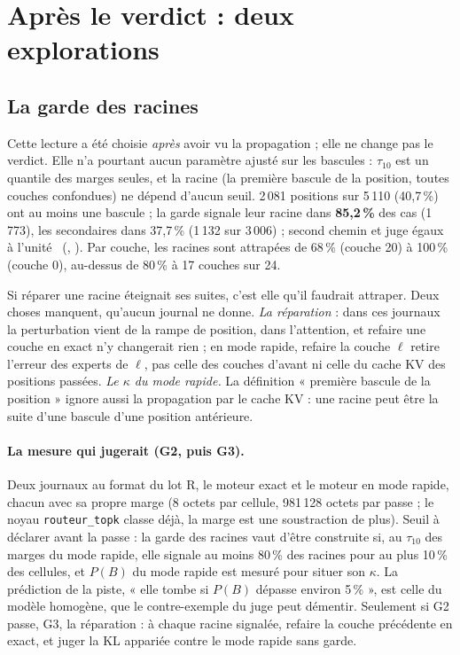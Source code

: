 \section{Après le verdict : deux explorations}\label{t3tro:sec:explorations}

\subsection{La garde des racines}\label{t3tro:sec:racines}

Cette lecture a été choisie \emph{après} avoir vu la propagation ; elle ne change pas le verdict. Elle n'a pourtant aucun paramètre ajusté sur les bascules : $\tau_{10}$ est un quantile des marges seules, et la racine (la première bascule de la position, toutes couches confondues) ne dépend d'aucun seuil. 2\,081 positions sur 5\,110 (40,7\,\%) ont au moins une bascule ; la garde signale leur racine dans \textbf{85,2\,\%} des cas (1\,773), les secondaires dans 37,7\,\% (1\,132 sur 3\,006) ; second chemin et juge égaux à l'unité \mes~(, ). Par couche, les racines sont attrapées de 68\,\% (couche 20) à 100\,\% (couche 0), au-dessus de 80\,\% à 17 couches sur 24.

Si réparer une racine éteignait ses suites, c'est elle qu'il faudrait attraper. Deux choses manquent, qu'aucun journal ne donne. \emph{La réparation} : dans ces journaux la perturbation vient de la rampe de position, dans l'attention, et refaire une couche en exact n'y changerait rien ; en mode rapide, refaire la couche $\ell$ retire l'erreur des experts de $\ell$, pas celle des couches d'avant ni celle du cache KV des positions passées. \emph{Le $\kappa$ du mode rapide.} La définition « première bascule de la position » ignore aussi la propagation par le cache KV : une racine peut être la suite d'une bascule d'une position antérieure.

\paragraph{La mesure qui jugerait (G2, puis G3).} Deux journaux au format du lot R, le moteur exact et le moteur en mode rapide, chacun avec sa propre marge (8 octets par cellule, 981\,128 octets par passe ; le noyau \texttt{routeur\_topk} classe déjà, la marge est une soustraction de plus). Seuil à déclarer avant la passe : la garde des racines vaut d'être construite si, au $\tau_{10}$ des marges du mode rapide, elle signale au moins 80\,\% des racines pour au plus 10\,\% des cellules, et $P(B)$ du mode rapide est mesuré pour situer son $\kappa$. La prédiction de la piste, « elle tombe si $P(B)$ dépasse environ 5\,\% », est celle du modèle homogène, que le contre-exemple du juge peut démentir. Seulement si G2 passe, G3, la réparation : à chaque racine signalée, refaire la couche précédente en exact, et juger la KL appariée contre le mode rapide sans garde.

